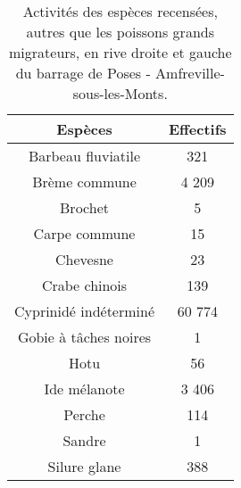 \begin{table}[H]
\centering
\caption{Activités des espèces recensées, autres que les poissons grands migrateurs, en rive droite et gauche du barrage de Poses - Amfreville-sous-les-Monts.} 
\label{bilesp}
\begin{tabular}{cc}
  \hline
Espèces & Effectifs \\ 
  \hline
Barbeau fluviatile &    321 \\ 
  Brème commune &  4 209 \\ 
  Brochet &      5 \\ 
  Carpe commune &     15 \\ 
  Chevesne &     23 \\ 
  Crabe chinois &    139 \\ 
  Cyprinidé indéterminé & 60 774 \\ 
  Gobie à tâches noires &      1 \\ 
  Hotu &     56 \\ 
  Ide mélanote &  3 406 \\ 
  Perche &    114 \\ 
  Sandre &      1 \\ 
  Silure glane &    388 \\ 
   \hline
\end{tabular}
\end{table}
